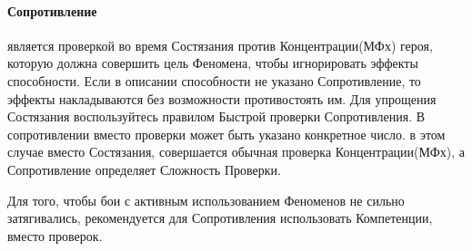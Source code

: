 \paragraph{Сопротивление} является проверкой во время Состязания против Концентрации(МФх) героя, которую должна совершить цель Феномена, чтобы игнорировать эффекты способности. Если в описании способности не указано Сопротивление, то эффекты накладываются без возможности противостоять им. Для упрощения Состязания воспользуйтесь правилом Быстрой проверки Сопротивления. В сопротивлении вместо проверки может быть указано конкретное число. в этом случае вместо Состязания, совершается обычная проверка Концентрации(МФх), а Сопротивление определяет Сложность Проверки.
\begin{tcolorbox}
Для того, чтобы бои с активным использованием Феноменов не сильно затягивались, рекомендуется для Сопротивления использовать Компетенции, вместо проверок.
\end{tcolorbox}

